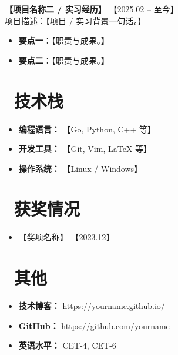 \documentclass[11pt]{article}
\newlength{\interProjectSpacing}
\newcommand{\projectsep}{\vspace{\interProjectSpacing}}
\newlength{\intraProjectTitleSep}
\newcommand{\titlebreak}{\\[\intraProjectTitleSep]}
\newlength{\intraProjectListTopSep}
\begin{document}
\projectsep

\textbf{【项目名称二 / 实习经历】} \hfill 【2025.02 -- 至今】 \titlebreak
项目描述：【项目 / 实习背景一句话。】
\begin{itemize}[nosep, topsep=\intraProjectListTopSep]
    \item \textbf{要点一}：【职责与成果。】
    \item \textbf{要点二}：【职责与成果。】
\end{itemize}


\section{\makebox[\widthof{\faCogs}][c]{\color{CVBlue}\faCogs}\ 技术栈}
\begin{itemize}[nosep]
    \item \textbf{编程语言：} 【Go, Python, C++ 等】
    \item \textbf{开发工具：} 【Git, Vim, LaTeX 等】
    \item \textbf{操作系统：} 【Linux / Windows】
\end{itemize}
\section{\makebox[\widthof{\faGraduationCap}][c]{\color{CVBlue}\faList}\ 获奖情况}
\begin{itemize}
    \item 【奖项名称】 \hfill 【2023.12】

\end{itemize}

\section{\makebox[\widthof{\faInfo}][c]{\color{CVBlue}\faInfo}\ 其他}
\begin{itemize}[parsep=0.5ex]
    \item \textbf{技术博客：} \href{https://yourname.github.io/}{https://yourname.github.io/}
    \item \textbf{GitHub：} \href{https://github.com/yourname}{https://github.com/yourname}
    \item \textbf{英语水平：} CET-4, CET-6
\end{itemize}
\end{document}
